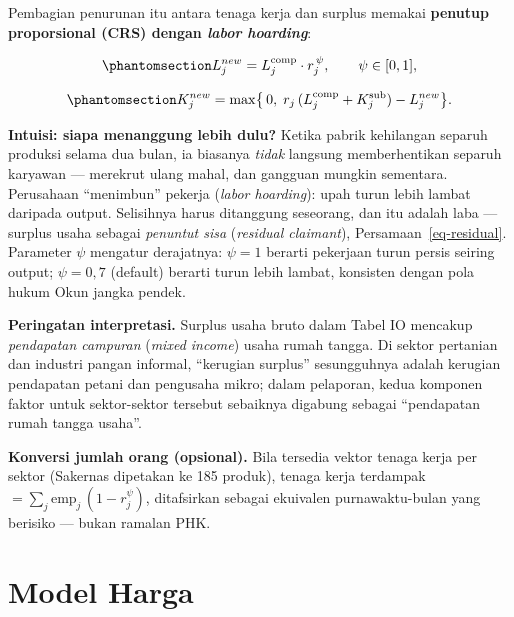 \documentclass[
  manuscript=article,
  layout=publish,
  year=2026,
  volume=1,
]{den}
\begin{document}
Pembagian penurunan itu antara tenaga kerja dan surplus memakai
\textbf{penutup proporsional (CRS) dengan \emph{labor hoarding}}:

\begin{equation}\phantomsection\label{eq-hoarding}{
L^{new}_j = L^{\text{comp}}_j \cdot r_j^{\,\psi},
\qquad \psi \in [0,1],
}\end{equation}

\begin{equation}\phantomsection\label{eq-residual}{
K^{new}_j = \max\bigl\{\,0,\;
r_j\,(L^{\text{comp}}_j + K^{\text{sub}}_j) - L^{new}_j \bigr\}.
}\end{equation}

\begin{intuisi}

\textbf{Intuisi: siapa menanggung lebih dulu?} Ketika pabrik kehilangan
separuh produksi selama dua bulan, ia biasanya \emph{tidak} langsung
memberhentikan separuh karyawan --- merekrut ulang mahal, dan gangguan
mungkin sementara. Perusahaan ``menimbun'' pekerja (\emph{labor
hoarding}): upah turun lebih lambat daripada output. Selisihnya harus
ditanggung seseorang, dan itu adalah laba --- surplus usaha sebagai
\emph{penuntut sisa} (\emph{residual claimant}),
Persamaan~\ref{eq-residual}. Parameter \(\psi\) mengatur derajatnya:
\(\psi = 1\) berarti pekerjaan turun persis seiring output; \(\psi =
0{,}7\) (default) berarti turun lebih lambat, konsisten dengan pola
hukum Okun jangka pendek.

\end{intuisi}

\textbf{Peringatan interpretasi.} Surplus usaha bruto dalam Tabel IO
mencakup \emph{pendapatan campuran} (\emph{mixed income}) usaha rumah
tangga. Di sektor pertanian dan industri pangan informal, ``kerugian
surplus'' sesungguhnya adalah kerugian pendapatan petani dan pengusaha
mikro; dalam pelaporan, kedua komponen faktor untuk sektor-sektor
tersebut sebaiknya digabung sebagai ``pendapatan rumah tangga usaha''.

\textbf{Konversi jumlah orang (opsional).} Bila tersedia vektor tenaga
kerja per sektor (Sakernas dipetakan ke 185 produk), tenaga kerja
terdampak \(= \sum_j
\text{emp}_j \,(1 - r_j^{\psi})\), ditafsirkan sebagai ekuivalen
purnawaktu-bulan yang berisiko --- bukan ramalan PHK.

\section{Model Harga}\label{sec-price}
\end{document}
